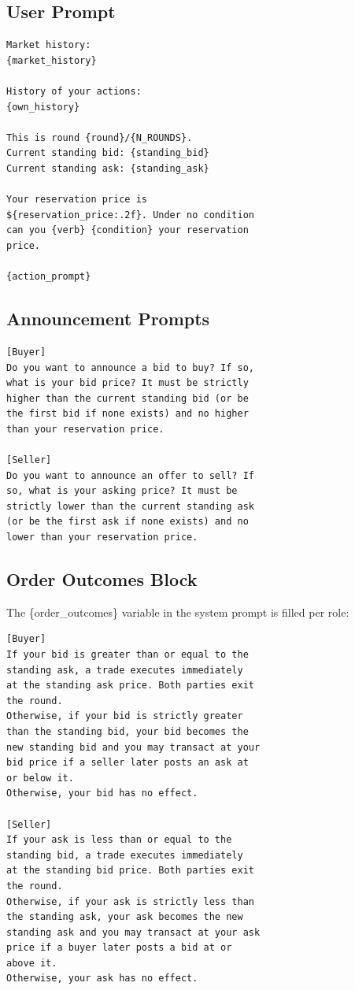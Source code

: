 \documentclass[letterpaper]{article} %
\begin{document}
\subsection{User Prompt}

\begin{lstlisting}[style=promptcol]
Market history:
{market_history}

History of your actions:
{own_history}

This is round {round}/{N_ROUNDS}.
Current standing bid: {standing_bid}
Current standing ask: {standing_ask}

Your reservation price is
${reservation_price:.2f}. Under no condition
can you {verb} {condition} your reservation
price.

{action_prompt}
\end{lstlisting}

\subsection{Announcement Prompts}

\begin{lstlisting}[style=promptcol]
[Buyer]
Do you want to announce a bid to buy? If so,
what is your bid price? It must be strictly
higher than the current standing bid (or be
the first bid if none exists) and no higher
than your reservation price.

[Seller]
Do you want to announce an offer to sell? If
so, what is your asking price? It must be
strictly lower than the current standing ask
(or be the first ask if none exists) and no
lower than your reservation price.
\end{lstlisting}

\subsection{Order Outcomes Block}

The \{order\_outcomes\} variable in the system prompt is
filled per role:

\begin{lstlisting}[style=promptcol]
[Buyer]
If your bid is greater than or equal to the
standing ask, a trade executes immediately
at the standing ask price. Both parties exit
the round.
Otherwise, if your bid is strictly greater
than the standing bid, your bid becomes the
new standing bid and you may transact at your
bid price if a seller later posts an ask at
or below it.
Otherwise, your bid has no effect.

[Seller]
If your ask is less than or equal to the
standing bid, a trade executes immediately
at the standing bid price. Both parties exit
the round.
Otherwise, if your ask is strictly less than
the standing ask, your ask becomes the new
standing ask and you may transact at your ask
price if a buyer later posts a bid at or
above it.
Otherwise, your ask has no effect.
\end{lstlisting}
\end{document}
